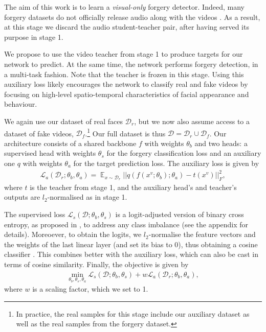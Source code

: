 \documentclass[10pt,twocolumn,letterpaper]{article}
\begin{document}
The aim of this work is to learn a \textit{visual-only} forgery detector. Indeed, many forgery datasets do not officially release audio along with the videos \cite{rossler2019faceforensics++, jiang2020deeperforensics, li2020celeb}. As a result, at this stage we discard the audio student-teacher pair, after having served its purpose in stage 1. 

We propose to use the video teacher from stage 1 to produce targets for our network to predict. At the same time, the network performs forgery detection, in a multi-task fashion. Note that the teacher is frozen in this stage. Using this auxiliary loss likely encourages the network to classify real and fake videos by focusing on high-level spatio-temporal characteristics of facial appearance and behaviour. 

\begin{description}[wide,itemindent=\labelsep]
\item[Formulation.] We again use our dataset of real faces $\mathcal{D}_r$, but we now also assume access to a dataset of fake videos, $\mathcal{D}_f$.\footnote{In practice, the real samples for this stage include our auxiliary dataset as well as the real samples from the forgery dataset.} Our full dataset is thus $\mathcal{D}=\mathcal{D}_r \cup\mathcal{D}_f$. Our architecture consists of a shared backbone $f$ with weights $\theta_b$ and two heads: a supervised head with weights $\theta_s$ for the forgery classification loss and an auxiliary one $q$ with weights $\theta_a$ for the target prediction loss. The auxiliary loss is given by
\begin{align}
    \mathcal{L}_a(\mathcal{D}_r; \theta_b, \theta_a)=\mathop{\mathbb{E}}_{x\sim\mathcal{D}_r}||q\left(f(x^v;\theta_b);\theta_a\right)-t(x^v)||^2_F,
\end{align}
where $t$ is the teacher from stage 1, and the auxiliary head's and teacher's outputs are $l_2$-normalised as in stage 1.

The supervised loss $\mathcal{L}_s(\mathcal{D}; \theta_b, \theta_s)$ is a logit-adjusted version of binary cross entropy, as proposed in \cite{menon2020long}, to address any class imbalance (see the appendix for details). Moreoever, to obtain the logits, we $l_2$-normalise the feature vectors and the weights of the last linear layer (and set its bias to 0), thus obtaining a cosine classifier \cite{wang2017normface}. This combines better with the auxiliary loss, which can also be cast in terms of cosine similarity. Finally, the objective is given by
\begin{align}
    \min_{\theta_b,\theta_s, \theta_a}\mathcal{L}_s(\mathcal{D}; \theta_b, \theta_s) + w\mathcal{L}_a(\mathcal{D}_r; \theta_b, \theta_a),
\end{align}
where $w$ is a scaling factor, which we set to 1.


\end{description}
\end{document}
